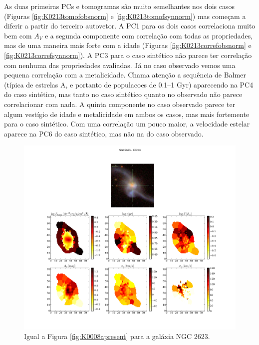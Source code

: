 As duas primeiras PCs e tomogramas são muito semelhantes nos dois casos (Figuras \ref{fig:K0213tomofobsnorm} e
\ref{fig:K0213tomofsynnorm}) mas começam a diferir a partir do terceiro autovetor. A PC1 para os dois casos correlaciona
muito bem com $A_V$ e a segunda componente com correlação com todas as propriedades, mas de uma maneira mais forte com a
idade (Figuras \ref{fig:K0213correfobsnorm} e \ref{fig:K0213correfsynnorm}). A PC3 para o caso sintético não parece ter
correlação com nenhuma das propriedades avaliadas. Já no caso observado vemos uma pequena correlação com a metalicidade.
Chama atenção a sequência de Balmer (típica de estrelas A, e portanto de populacoes de 0.1--1 Gyr) aparecendo na PC4 do
caso sintético, mas tanto no caso sintético quanto no observado não parece correlacionar com nada. A quinta componente
no caso observado parece ter algum vestígio de idade e metalicidade em ambos os casos, mas mais fortemente para o caso
sintético. Com uma correlação um pouco maior, a velocidade estelar aparece na PC6 do caso sintético, mas não na do caso
observado.

\begin{figure}
    \includegraphics[width=1.\textwidth]{figuras/K0213-apresent.pdf}
    \caption[Propriedades f\'isicas da gal\'axia NGC 2623.]
    {Igual a Figura \ref{fig:K0008apresent} para a galáxia NGC 2623.}
    \label{fig:K0213apresent}
\end{figure}

